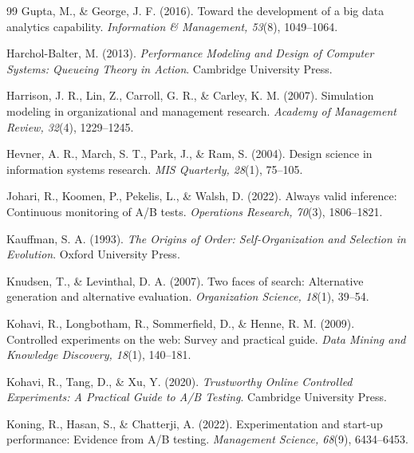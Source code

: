 \begin{thebibliography}{99}
 Gupta, M., \& George, J. F. (2016). Toward the development of a big data analytics capability. \textit{Information \& Management, 53}(8), 1049--1064. 

 Harchol-Balter, M. (2013). \textit{Performance Modeling and Design of Computer Systems: Queueing Theory in Action}. Cambridge University Press. 

 Harrison, J. R., Lin, Z., Carroll, G. R., \& Carley, K. M. (2007). Simulation modeling in organizational and management research. \textit{Academy of Management Review, 32}(4), 1229--1245. 

 Hevner, A. R., March, S. T., Park, J., \& Ram, S. (2004). Design science in information systems research. \textit{MIS Quarterly, 28}(1), 75--105. 

 Johari, R., Koomen, P., Pekelis, L., \& Walsh, D. (2022). Always valid inference: Continuous monitoring of A/B tests. \textit{Operations Research, 70}(3), 1806--1821. 

 Kauffman, S. A. (1993). \textit{The Origins of Order: Self-Organization and Selection in Evolution}. Oxford University Press.

 Knudsen, T., \& Levinthal, D. A. (2007). Two faces of search: Alternative generation and alternative evaluation. \textit{Organization Science, 18}(1), 39--54. 

 Kohavi, R., Longbotham, R., Sommerfield, D., \& Henne, R. M. (2009). Controlled experiments on the web: Survey and practical guide. \textit{Data Mining and Knowledge Discovery, 18}(1), 140--181. 

 Kohavi, R., Tang, D., \& Xu, Y. (2020). \textit{Trustworthy Online Controlled Experiments: A Practical Guide to A/B Testing}. Cambridge University Press. 

 Koning, R., Hasan, S., \& Chatterji, A. (2022). Experimentation and start-up performance: Evidence from A/B testing. \textit{Management Science, 68}(9), 6434--6453. 


\end{thebibliography}
